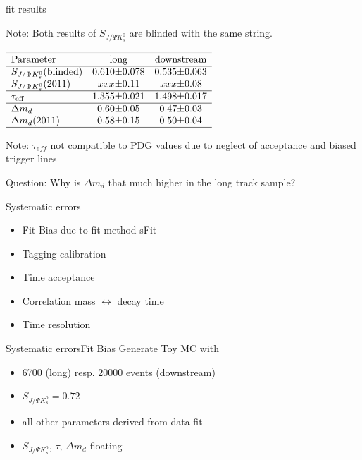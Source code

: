 \documentclass{beamer}
\newcommand{\SJPsi}{S_{J/\Psi K_s^0}}
\begin{document}
	\begin{frame}{fit results}
	\begin{alert}{Note:}
	Both results of $\SJPsi$ are blinded with the same string.
	\end{alert}
	\begin{center}
	$\begin{array}{l r@{\pm}l r@{\pm}l}
	\hline \hline
	\text{Parameter} & \multicolumn{2}{c}{\text{long}} & \multicolumn{2}{c}{\text{downstream}}\\ \hline
	\SJPsi (\text{blinded}) & 0.610 & 0.078 & 0.535 & 0.063 \\
	\SJPsi (2011)           & xxx   & 0.11  & xxx   & 0.08  \\ \hline
	\tau_{\text{eff}}       & 1.355 & 0.021 & 1.498 & 0.017 \\ \hline
	\Delta m_d         & 0.60 & 0.05 & 0.47 & 0.03 \\
    \Delta m_d (2011)  & 0.58 & 0.15 & 0.50 & 0.04 \\
	\hline
	\end{array}$
	\end{center}
    \begin{alert}{Note:}
	$\tau_{eff}$ not compatible to PDG values due to neglect of acceptance and biased trigger lines
	\end{alert}
	\begin{alert}{Question:}
	Why is $\Delta m_d$ that much higher in the long track sample?
	\end{alert}
	\end{frame}

	
	\begin{frame}{Systematic errors}
	\begin{itemize}
		\item Fit Bias due to fit method sFit
	    \item Tagging calibration
	    \item Time acceptance
	    \item Correlation mass $\leftrightarrow$ decay time
	    \item Time resolution
	\end{itemize}
	\end{frame}
	
	\begin{frame}{Systematic errors}{Fit Bias}
	Generate Toy MC with 
	\begin{itemize}
	\item 6700 (long) resp. 20000 events (downstream)
	\item $\SJPsi = 0.72$ 
	\item all other parameters derived from data fit
	\item $\SJPsi$, $\tau$, $\Delta m_d$ floating
	\end{itemize}
    \end{frame}	
	
\end{document}
